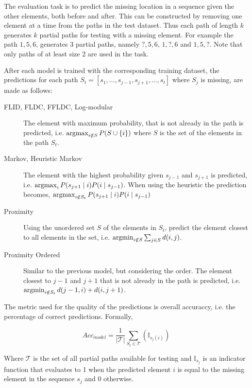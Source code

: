 The evaluation task is to predict the missing location in a sequence given the other elements, both before and after. This can be constructed by removing one element at a time from the paths in the test dataset. Thus each path of length $k$ generates $k$ partial paths for testing with a missing element. For example the path $1,5,6$, generates 3 partial paths, namely $?,5,6$, $1,?,6$ and $1,5,?$. Note that only paths of at least size 2 are used in the task.

After each model is trained with the corresponding training dataset, the predictions for each path $S_{t} = [s_{1}, \dots, s_{j-1}, s_{j+1}, \dots, s_{t}]$ where $S_{j}$ is missing, are made as follows:

\begin{description}
  \item[FLID, FLDC, FFLDC, Log-modular] The element with maximum probability, that is not already in the path is predicted, i.e. $\operatorname*{argmax}_{i \notin S} P(S \cup \{i\})$ where $S$ is the set of the elements in the path $S_{t}$.
  \item[Markov, Heuristic Markov] The element with the highest probability given $s_{j-1}$ and $s_{j+1}$ is predicted, i.e. $\operatorname*{argmax}_{i} P(s_{j+1} \mid i)P(i \mid s_{j-1})$. When using the heuristic the prediction becomes, $\operatorname*{argmax}_{i \notin S_{t}} P(s_{j+1} \mid i)P(i \mid s_{j-1})$
  \item[Proximity] Using the unordered set $S$ of the elements in $S_{t}$, predict the element closest to all elements in the set, i.e. $\operatorname*{argmin}_{i \notin S} \sum_{j \in S}d(i, j)$.
  \item[Proximity Ordered] Similar to the previous model, but considering the order. The element closest to $j-1$ and $j+1$ that is not already in the path is predicted, i.e. $\operatorname*{argmin}_{i \notin S_{t}}d(j-1, i) + d(i, j+1)$.
\end{description}

The metric used for the quality of the predictions is overall accuraccy, i.e. the percentage of correct predictions. Formally, 

\begin{equation}
  Acc_{model} = \frac{1}{|\mathcal{T}|}\sum_{S_{t} \in \mathcal{T}}(\mathbb{I}_{s_{j}(i)})
\end{equation}

Where $\mathcal{T}$ is the set of all partial paths available for testing and $\mathbb{I}_{s_{j}}$ is an indicator function that evaluates to 1 when the predicted element $i$ is equal to the missing element in the sequence $s_{j}$ and 0 otherwise.

